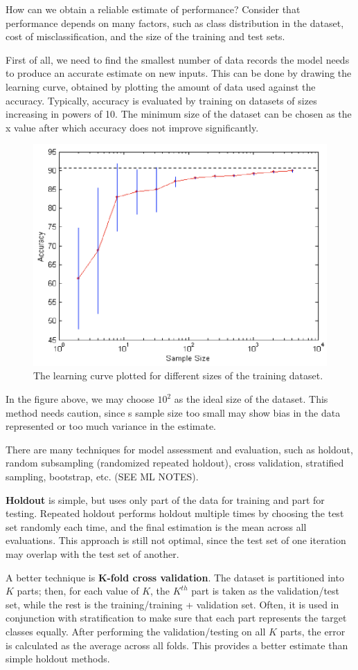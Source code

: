 How can we obtain a reliable estimate of performance? Consider that performance depends on many factors, such as class distribution in the dataset, cost of misclassification, and the size of the training and test sets.

First of all, we need to find the smallest number of data records the model needs to produce an accurate estimate on new inputs. This can be done by drawing the learning curve, obtained by plotting the amount of data used against the accuracy. Typically, accuracy is evaluated by training on datasets of sizes increasing in powers of 10. The minimum size of the dataset can be chosen as the x value after which accuracy does not improve significantly.

\begin{figure}[h]
    \centering
    \includegraphics[width=0.5\linewidth]{img/Learning curve.png}
    \caption{The learning curve plotted for different sizes of the training dataset.}
\end{figure}
In the figure above, we may choose $10^2$ as the ideal size of the dataset. This method needs caution, since s sample size too small may show bias in the data represented or too much variance in the estimate.

There are many techniques for model assessment and evaluation, such as holdout, random subsampling (randomized repeated holdout), cross validation, stratified sampling, bootstrap, etc. (SEE ML NOTES).

\textbf{Holdout} is simple, but uses only part of the data for training and part for testing. Repeated holdout performs holdout multiple times by choosing the test set randomly each time, and the final estimation is the mean across all evaluations. This approach is still not optimal, since the test set of one iteration may overlap with the test set of another.

A better technique is \textbf{K-fold cross validation}. The dataset is partitioned into $K$ parts; then, for each value of $K$, the $K^{th}$ part is taken as the validation/test set, while the rest is the training/training + validation set. Often, it is used in conjunction with stratification to make sure that each part represents the target classes equally. After performing the validation/testing on all $K$ parts, the error is calculated as the average across all folds. This provides a better estimate than simple holdout methods.

